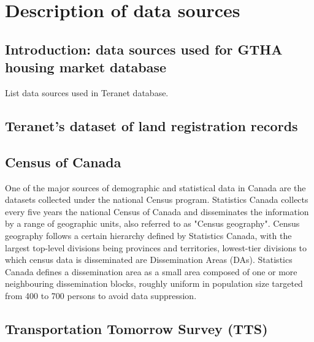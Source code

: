 \chapter{Description of data sources} \label{ch:description_of_data_sources}

\section{Introduction: data sources used for GTHA housing market database} \label{sec:intro_data_sources}

List data sources used in Teranet database.

\section{Teranet's dataset of land registration records} \label{sec:teranet_description}


\section{Census of Canada} \label{sec:census_description}
One of the major sources of demographic and statistical data in Canada are the datasets collected under the national Census program.
Statistics Canada collects every five years the national Census of Canada and disseminates the information by a range of geographic units, also referred to as "Census geography"\cite{MapandDataLibrary2019}.
Census geography follows a certain hierarchy defined by Statistics Canada, with the largest top-level divisions being provinces and territories, lowest-tier divisions to which census data is disseminated are Dissemination Areas (DAs)\cite{StatisticsCanada2018}.
Statistics Canada defines a dissemination area as a small area composed of one or more neighbouring dissemination blocks, roughly uniform in population size targeted from 400 to 700 persons to avoid data suppression\cite{StatisticsCanada2015}.

\section{Transportation Tomorrow Survey (TTS)} \label{tts_description}

